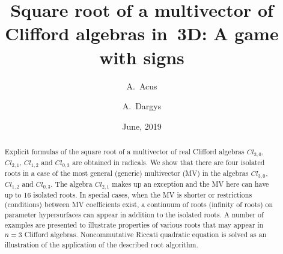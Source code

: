 \documentclass{birkjour}
\newcommand{\cl}[2]{\ensuremath{\mathit{Cl}_{#1,#2}}}
\begin{document}

\title[Square root of a multivector of Clifford algebras in~3D]
 {Square root of a multivector of Clifford algebras in~3D: A game with signs}

\author{A.~Acus}
\address{Institute of Theoretical Physics and Astronomy,\br
Vilnius University,\br Saul{\.e}tekio 3, LT-10257 Vilnius,
Lithuania} 

\author{A.~Dargys}

\address{%
Center for Physical Sciences and Technology,\br Semiconductor
Physics Institute,\br Saul{\.e}tekio 3, LT-10257 Vilnius,
Lithuania}



\date{June, 2019}


\begin{abstract}
Explicit formulas of the square root of a multivector of real
Clifford algebras \cl{3}{0}, \cl{2}{1}, \cl{1}{2} and \cl{0}{3}
are obtained in radicals. We show that there are four isolated
roots in a case of the most general (generic) multivector (MV) in
the algebras \cl{3}{0},  \cl{1}{2} and \cl{0}{3}. The algebra
\cl{2}{1} makes up an exception and the MV here can have up to 16
isolated roots. In special cases, when the MV is shorter or
restrictions (conditions) between  MV coefficients exist, a
continuum of roots (infinity of roots) on parameter hypersurfaces
can appear in addition to the isolated roots. A number of examples
are presented to illustrate properties of various roots that may
appear in $n=3$ Clifford algebras. Noncommutative Riccati
quadratic equation is solved as an illustration of the application
of the described root algorithm.
\end{abstract}

\maketitle



\end{document}
